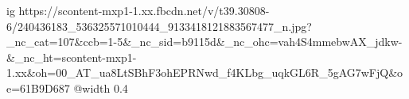  
 
 
 
 

\ifcmt
  ig https://scontent-mxp1-1.xx.fbcdn.net/v/t39.30808-6/240436183_536325571010444_9133418121883567477_n.jpg?_nc_cat=107&ccb=1-5&_nc_sid=b9115d&_nc_ohc=vah4S4mmebwAX_jdkw-&_nc_ht=scontent-mxp1-1.xx&oh=00_AT_ua8LtSBhF3ohEPRNwd_f4KLbg_uqkGL6R_5gAG7wFjQ&oe=61B9D687
  @width 0.4
\fi
